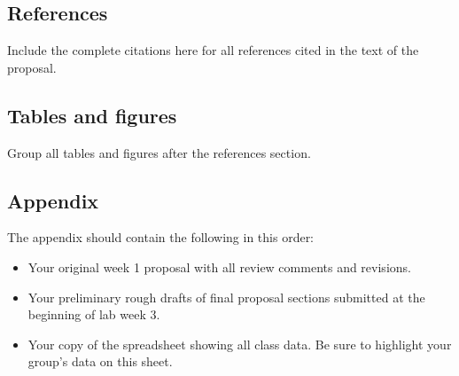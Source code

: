 \documentclass[12pt,a4paper]{article}
\begin{document}
\subsection*{References}
Include the complete citations here for all references cited in the text of the proposal.
\subsection*{Tables and figures}
Group all tables and figures after the references section.
\subsection*{Appendix}
The appendix should contain the following in this order:
\begin{itemize}
\item Your original week 1 proposal with all review comments and revisions.
\item Your preliminary rough drafts of final proposal sections submitted at the beginning of lab week 3.
\item Your copy of the spreadsheet showing all class data. Be sure to highlight your group's data on this sheet.
\end{itemize}
\end{document}
